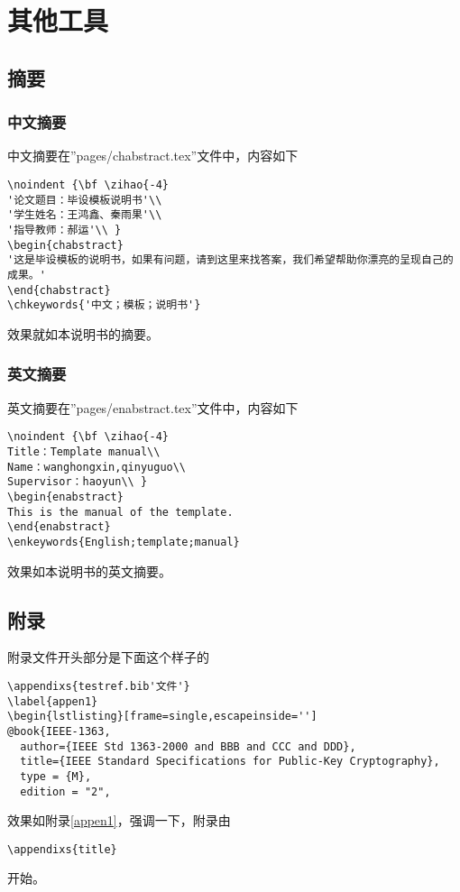 \section{其他工具}
\label{ch3}

\subsection{摘要}
\label{ch3_1}
\subsubsection{中文摘要}
中文摘要在''pages/chabstract.tex''文件中，内容如下
\begin{lstlisting}[frame=single,escapeinside='']
 \noindent {\bf \zihao{-4}
'论文题目：毕设模板说明书'\\
'学生姓名：王鸿鑫、秦雨果'\\
'指导教师：郝运'\\ }
\begin{chabstract}
'这是毕设模板的说明书，如果有问题，请到这里来找答案，我们希望帮助你漂亮的呈现自己的成果。'
\end{chabstract}
\chkeywords{'中文；模板；说明书'}
\end{lstlisting}
效果就如本说明书的摘要。\par

\subsubsection{英文摘要}
英文摘要在''pages/enabstract.tex''文件中，内容如下
\begin{lstlisting}[frame=single,escapeinside='']
 \noindent {\bf \zihao{-4}
Title：Template manual\\
Name：wanghongxin,qinyuguo\\
Supervisor：haoyun\\ }
\begin{enabstract}
This is the manual of the template.
\end{enabstract}
\enkeywords{English;template;manual}
\end{lstlisting}
效果如本说明书的英文摘要。\par

\subsection{附录}
\label{ch3_2}
附录文件开头部分是下面这个样子的
\begin{lstlisting}[frame=single,escapeinside='']
\appendixs{testref.bib'文件'}
\label{appen1}
\begin{lstlisting}[frame=single,escapeinside='']
@book{IEEE-1363,
  author={IEEE Std 1363-2000 and BBB and CCC and DDD},
  title={IEEE Standard Specifications for Public-Key Cryptography},
  type = {M},
  edition = "2",
\end{lstlisting}
效果如附录\ref{appen1}，强调一下，附录由
\begin{lstlisting}[frame=single,escapeinside='']
\appendixs{title}
\end{lstlisting}
开始。\par

